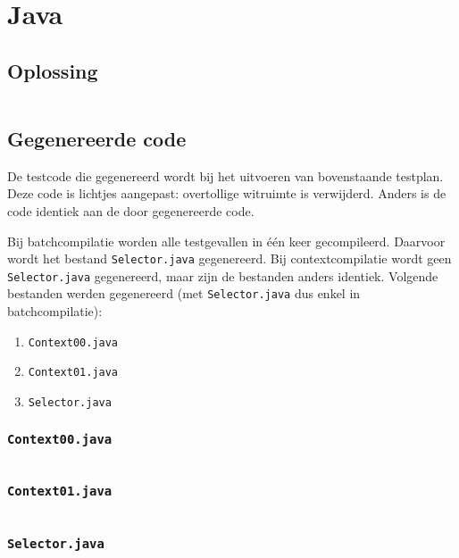 \section{Java}\label{sec:echo-java}

\subsection{Oplossing}\label{subsec:echo-java-oplossing}

\inputminted{java}{sources/echo/correct.java}

\subsection{Gegenereerde code}\label{subsec:echo-java-gegenereerde-code}

De testcode die gegenereerd wordt bij het uitvoeren van bovenstaande testplan.
Deze code is lichtjes aangepast: overtollige witruimte is verwijderd.
Anders is de code identiek aan de door \tested{} gegenereerde code.

Bij batchcompilatie worden alle testgevallen in één keer gecompileerd.
Daarvoor wordt het bestand \texttt{Selector.java} gegenereerd.
Bij contextcompilatie wordt geen \texttt{Selector.java} gegenereerd, maar zijn de bestanden anders identiek.
Volgende bestanden werden gegenereerd (met \texttt{Selector.java} dus enkel in batchcompilatie):

\begin{enumerate}
    \item \texttt{Context00.java}
    \item \texttt{Context01.java}
    \item \texttt{Selector.java}
\end{enumerate}

\subsubsection{\texttt{Context00.java}}

\inputminted{java}{sources/echo/Context00.java}

\subsubsection{\texttt{Context01.java}}

\inputminted{java}{sources/echo/Context01.java}

\subsubsection{\texttt{Selector.java}}


